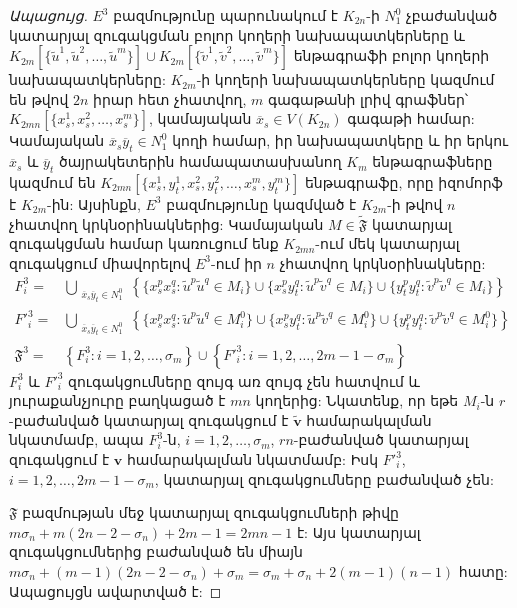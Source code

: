 \begin{proof}[Ապացույց]
$E^3$ բազմությունը պարունակում է $K_{2n}$-ի $N^0_1$ չբաժանված կատարյալ զուգակցման բոլոր կողերի նախապատկերները և $K_{2m}[\{\widetilde{u}^1,\widetilde{u}^2,\ldots,\widetilde{u}^m\}] \cup K_{2m}[\{\widetilde{v}^1,\widetilde{v}^2,\ldots,\widetilde{v}^m\}]$ ենթագրաֆի բոլոր կողերի նախապատկերները: $K_{2m}$-ի կողերի նախապատկերները կազմում են թվով $2n$ իրար հետ չհատվող, $m$ գագաթանի լրիվ գրաֆներ՝ $K_{2mn}\left[\{x_s^1,x_s^2,\ldots,x_s^m\}\right]$, կամայական $\overline{x}_s \in V(K_{2n})$ գագաթի համար: Կամայական $\overline{x}_s\overline{y}_t \in N^0_1$ կողի համար, իր նախապատկերը և իր երկու $\overline{x}_s$ և $\overline{y}_t$ ծայրակետերին համապատասխանող $K_{m}$ ենթագրաֆները կազմում են $K_{2mn}\left[\{x_s^1,y_t^1,x_s^2,y_t^2,\ldots,x_s^m,y_t^m\}\right]$ ենթագրաֆը, որը իզոմորֆ է $K_{2m}$-ին: Այսինքն, $E^3$ բազմությունը կազմված է $K_{2m}$-ի թվով $n$ չհատվող կրկնօրինակներից: Կամայական $M \in \widetilde{\mathfrak{F}}$ կատարյալ զուգակցման համար կառուցում ենք $K_{2mn}$-ում մեկ կատարյալ զուգակցում միավորելով $E^3$-ում իր $n$ չհատվող կրկնօրինակները: 
\begin{align*}
F^3_{i} = &
\bigcup\limits_{\substack{\overline{x}_s\overline{y}_t \in N^0_1}}
\left\{ 
\{x_s^{p}x_s^{q} : \widetilde{u}^{p}\widetilde{u}^{q} \in M_i\} 
\cup 
\{x_s^{p}y_t^{q} : \widetilde{u}^{p}\widetilde{v}^{q} \in M_i\} 
\cup
\{y_t^{p}y_t^{q} : \widetilde{v}^{p}\widetilde{v}^{q} \in M_i\} 
\right\}\\
F'^3_{i} = &
\bigcup\limits_{\substack{\overline{x}_s\overline{y}_t \in N^0_1}}
\left\{ 
\{x_s^{p}x_s^{q} : \widetilde{u}^{p}\widetilde{u}^{q} \in M^0_i\} 
\cup 
\{x_s^{p}y_t^{q} : \widetilde{u}^{p}\widetilde{v}^{q} \in M^0_i\} 
\cup
\{y_t^{p}y_t^{q} : \widetilde{v}^{p}\widetilde{v}^{q} \in M^0_i\} 
\right\}\\
\mathfrak{F}^3 = &\left\{F^3_{i} : i=1,2,\ldots,\sigma_m\right\} \cup \left\{F'^3_{i} : i=1,2,\ldots,2m-1-\sigma_m\right\}
\end{align*}
$F^3_i$ և $F'^3_i$ զուգակցումները զույգ առ զույգ չեն հատվում և յուրաքանչյուրը բաղկացած է $mn$ կողերից: Նկատենք, որ եթե $M_i$-ն $r$-բաժանված կատարյալ զուգակցում է $\widetilde{\mathbf{v}}$ համարակալման նկատմամբ, ապա $F^3_i$-ն, $i=1,2,\ldots,\sigma_m$, $rn$-բաժանված կատարյալ զուգակցում է $\mathbf{v}$ համարակալման նկատմամբ: Իսկ $F'^3_i$, $i=1,2,\ldots,2m-1-\sigma_m$, կատարյալ զուգակցումները բաժանված չեն:

$\mathfrak{F}$ բազմության մեջ կատարյալ զուգակցումների թիվը $m\sigma_n + m(2n-2-\sigma_n) + 2m-1 = 2mn-1$ է: Այս կատարյալ զուգակցումներից բաժանված են միայն $m\sigma_n + (m-1)(2n-2-\sigma_n) + \sigma_m = \sigma_m+\sigma_n+2(m-1)(n-1)$ հատը: Ապացույցն ավարտված է:
\end{proof}

